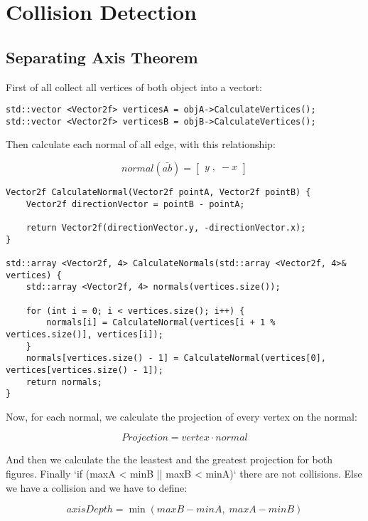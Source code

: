 \chapter{Collision Detection}
\section{Separating Axis Theorem}
First of all collect all vertices of both object into a vectort:

\begin{verbatim}
std::vector <Vector2f> verticesA = objA->CalculateVertices();
std::vector <Vector2f> verticesB = objB->CalculateVertices();
\end{verbatim}

Then calculate each normal of all edge, with this relationship:

\[
    normal(\bar{ab}) = \begin{bmatrix}y \; , \; -x \end{bmatrix}
\]

\begin{verbatim}
Vector2f CalculateNormal(Vector2f pointA, Vector2f pointB) {
    Vector2f directionVector = pointB - pointA;

    return Vector2f(directionVector.y, -directionVector.x);
}

std::array <Vector2f, 4> CalculateNormals(std::array <Vector2f, 4>& vertices) {
    std::array <Vector2f, 4> normals(vertices.size());

    for (int i = 0; i < vertices.size(); i++) {
        normals[i] = CalculateNormal(vertices[i + 1 % vertices.size()], vertices[i]);
    }
    normals[vertices.size() - 1] = CalculateNormal(vertices[0], vertices[vertices.size() - 1]);
    return normals;
}
\end{verbatim}

Now, for each normal, we calculate the projection of every vertex on the normal:

\[Projection = vertex \cdot normal\]

And then we calculate the the leastest and the greatest projection for both figures.
Finally `if (maxA < minB || maxB < minA)` there are not collisions.
Else we have a collision and we have to define:

\[axisDepth = \min(maxB - minA,\; maxA - minB)\]


